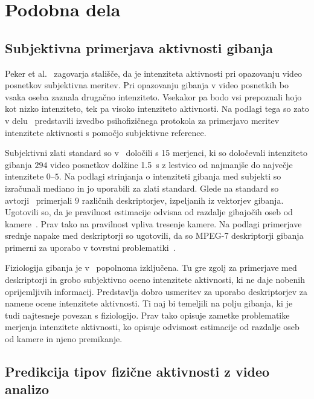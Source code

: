 \section{Podobna dela}\label{sec:podobna-dela}



\subsection{Subjektivna primerjava aktivnosti gibanja}\label{sec:subjektivna-primerjava}

Peker et al.~\cite{peker2004framework} zagovarja stališče, da je intenziteta aktivnosti pri opazovanju video posnetkov subjektivna meritev. Pri opazovanju gibanja v video posnetkih bo vsaka oseba zaznala drugačno intenziteto. Vsekakor pa bodo vsi prepoznali hojo kot nizko intenziteto, tek pa visoko intenziteto aktivnosti. Na podlagi tega so zato v delu~\cite{peker2004framework} predstavili izvedbo psihofizičnega protokola za primerjavo meritev intenzitete aktivnosti s pomočjo subjektivne reference.

Subjektivni zlati standard so v~\cite{peker2004framework} določili s 15 merjenci, ki so določevali intenziteto gibanja $294$ video posnetkov dolžine \SI{1.5}{\s} z lestvico od najmanjše do največje intenzitete $0$--$5$. Na podlagi strinjanja o intenziteti gibanja med subjekti so izračunali mediano in jo uporabili za zlati standard. Glede na standard so avtorji~\cite{peker2004framework} primerjali $9$ različnih deskriptorjev, izpeljanih iz vektorjev gibanja. Ugotovili so, da je pravilnost estimacije odvisna od razdalje gibajočih oseb od kamere~\cite{peker2004framework}. Prav tako na pravilnost vpliva tresenje kamere. Na podlagi primerjave srednje napake med deskriptorji so ugotovili, da so MPEG-7 deskriptorji gibanja primerni za uporabo v tovrstni problematiki~\cite{peker2004framework}.

Fiziologija gibanja je v~\cite{peker2004framework} popolnoma izključena. Tu gre zgolj za primerjave med deskriptorji in grobo subjektivno oceno intenzitete aktivnosti, ki ne daje nobenih oprijemljivih informacij. Predstavlja dobro usmeritev za uporabo deskriptorjev za namene ocene intenzitete aktivnosti. Ti naj bi temeljili na polju gibanja, ki je tudi najtesneje povezan s fiziologijo. Prav tako opisuje zametke problematike merjenja intenzitete aktivnosti, ko opisuje odvisnost estimacije od razdalje oseb od kamere in njeno premikanje.




\subsection{Predikcija tipov fizične aktivnosti z video analizo}

